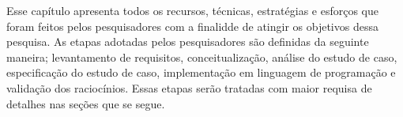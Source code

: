 Esse capítulo apresenta todos os recursos, técnicas, estratégias e esforços que foram feitos pelos pesquisadores com a finalidde de atingir os objetivos dessa pesquisa. As etapas adotadas pelos pesquisadores são definidas da seguinte maneira; levantamento de requisitos, conceitualização, análise do estudo de caso, especificação do estudo de caso, implementação em linguagem de programação e validação dos raciocínios. Essas etapas serão tratadas com maior requisa de detalhes nas seções que se segue. 
